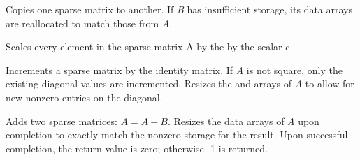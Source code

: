 \documentclass[letterpaper,10pt,english]{sphinxmanual}
\begin{document}

\begin{fulllineitems}
\label{linear_solvers/SLS:c.CopySparseMat}
Copies one sparse matrix to another.  If \emph{B} has insufficient
storage, its data arrays are reallocated to match those from \emph{A}.

\end{fulllineitems}


\begin{fulllineitems}
\label{linear_solvers/SLS:c.ScaleSparseMat}
Scales every element in the sparse matrix A by the by the
scalar c.

\end{fulllineitems}


\begin{fulllineitems}
\label{linear_solvers/SLS:c.AddIdentitySparseMat}
Increments a sparse matrix by the identity matrix.  If \emph{A} is not
square, only the existing diagonal values are incremented.  Resizes
the  and  arrays of \emph{A} to allow for new nonzero
entries on the diagonal.

\end{fulllineitems}


\begin{fulllineitems}
\label{linear_solvers/SLS:c.SlsAddMat}
Adds two sparse matrices: \(A = A+B\).  Resizes the data arrays
of \emph{A} upon completion to exactly match the nonzero storage for
the result.  Upon successful completion, the return value is zero;
otherwise -1 is returned.

\end{fulllineitems}
\end{document}

